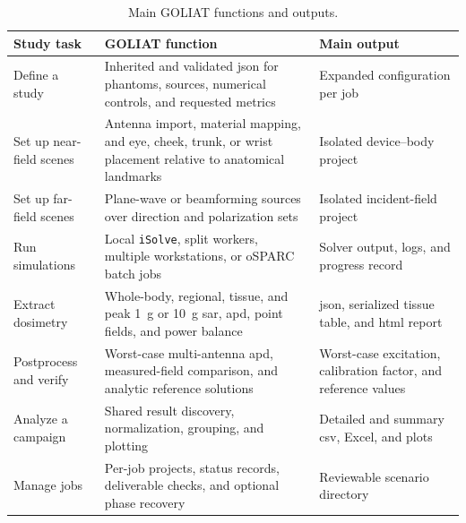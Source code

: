 \documentclass[final,5p,times,twocolumn]{elsarticle}
\begin{document}
\begin{table}[!ht]
\centering
\small
\begin{tabularx}{\textwidth}{@{}>{\raggedright\arraybackslash}p{}>{\raggedright\arraybackslash}p{}>{\raggedright\arraybackslash}X@{}}
\toprule
Study task & GOLIAT function & Main output \\
\midrule
Define a study & Inherited and validated \gls{json} for phantoms, sources, numerical controls, and requested metrics & Expanded configuration per job \\
Set up near-field scenes & Antenna import, material mapping, and eye, cheek, trunk, or wrist placement relative to anatomical landmarks & Isolated device--body project \\
Set up far-field scenes & Plane-wave or beamforming sources over direction and polarization sets & Isolated incident-field project \\
Run simulations & Local \texttt{iSolve}, split workers, multiple workstations, or oSPARC batch jobs & Solver output, logs, and progress record \\
Extract dosimetry & Whole-body, regional, tissue, and peak 1~g or 10~g \gls{sar}, \gls{apd}, point fields, and power balance & \gls{json}, serialized tissue table, and \gls{html} report \\
Postprocess and verify & Worst-case multi-antenna \gls{apd}, measured-field comparison, and analytic reference solutions & Worst-case excitation, calibration factor, and reference values \\
Analyze a campaign & Shared result discovery, normalization, grouping, and plotting & Detailed and summary \gls{csv}, Excel, and plots \\
Manage jobs & Per-job projects, status records, deliverable checks, and optional phase recovery & Reviewable scenario directory \\
\bottomrule
\end{tabularx}
\caption{Main GOLIAT functions and outputs.}
\label{tab:capabilities}
\end{table}
\end{document}
